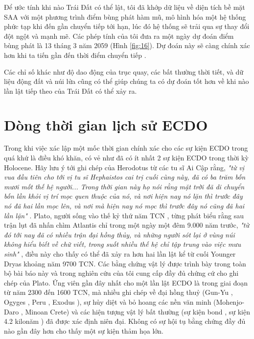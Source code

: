 \documentclass[10pt,twocolumn,letterpaper]{article}
\begin{document}
Để ước tính khi nào Trái Đất có thể lật, tôi đã khớp dữ liệu về diện tích bề mặt SAA với một phương trình điểm bùng phát hàm mũ, mô hình hóa một hệ thống phức tạp khi đến gần chuyển tiếp tới hạn, lúc đó hệ thống sẽ trải qua sự thay đổi đột ngột và mạnh mẽ. Các phép tính của tôi đưa ra một ngày dự đoán điểm bùng phát là 13 tháng 3 năm 2059 (Hình \ref{fig:16}). Dự đoán này sẽ càng chính xác hơn khi ta tiến gần đến thời điểm chuyển tiếp \cite{136}.

Các chỉ số khác như độ dao động của trục quay, các bất thường thời tiết, và dữ liệu động đất và núi lửa cũng có thể giúp chúng ta có dự đoán tốt hơn về khi nào lần lật tiếp theo của Trái Đất có thể xảy ra.

\section{Dòng thời gian lịch sử ECDO}

Trong khi việc xác lập một mốc thời gian chính xác cho các sự kiện ECDO trong quá khứ là điều khó khăn, có vẻ như đã có ít nhất 2 sự kiện ECDO trong thời kỳ Holocene. Hãy lưu ý tới ghi chép của Herodotus từ các tu sĩ Ai Cập rằng, \textit{"từ vị vua đầu tiên cho tới vị tu sĩ Hephaistos cai trị cuối cùng này, đã có ba trăm bốn mươi mốt thế hệ người... Trong thời gian này họ nói rằng mặt trời đã di chuyển bốn lần khỏi vị trí mọc quen thuộc của nó, và nơi hiện nay nó lặn thì trước đây nó đã hai lần mọc lên, và nơi mà hiện nay nó mọc thì trước đây nó cũng đã hai lần lặn"} \cite{32}. Plato, người sống vào thế kỷ thứ năm TCN \cite{111}, từng phát biểu rằng sau trận lụt đã nhấn chìm Atlantis chỉ trong một ngày một đêm 9.000 năm trước, \textit{"từ đó tới nay đã có nhiều trận đại hồng thủy, và những người sót lại ở vùng núi không hiểu biết về chữ viết, trong suốt nhiều thế hệ chỉ tập trung vào việc mưu sinh"} \cite{112}, điều này cho thấy có thể đã xảy ra hơn hai lần lật kể từ cuối Younger Dryas khoảng năm 9700 TCN. Các bằng chứng vật lý được trình bày trong toàn bộ bài báo này và trong nghiên cứu của tôi \cite{2} cung cấp đầy đủ chứng cứ cho ghi chép của Plato.
Ứng viên gần đây nhất cho một lần lật ECDO là trong giai đoạn từ năm 2300 đến 1600 TCN, mà nhiều ghi chép về đại hồng thuỷ (Gun-Yu \cite{113,114,115}, Ogyges \cite{116,117}, Peru \cite{118,119}, Exodus \cite{120}), sự hủy diệt và bỏ hoang các nền văn minh (Mohenjo-Daro \cite{121}, Minoan Crete\cite{100,101}) và các hiện tượng vật lý bất thường (sự kiện bond \cite{122}, sự kiện 4.2 kilonăm \cite{90}) đã được xác định niên đại. Không có sự hội tụ bằng chứng đầy đủ nào gần đây hơn cho thấy một sự kiện thảm họa lớn.
\end{document}
